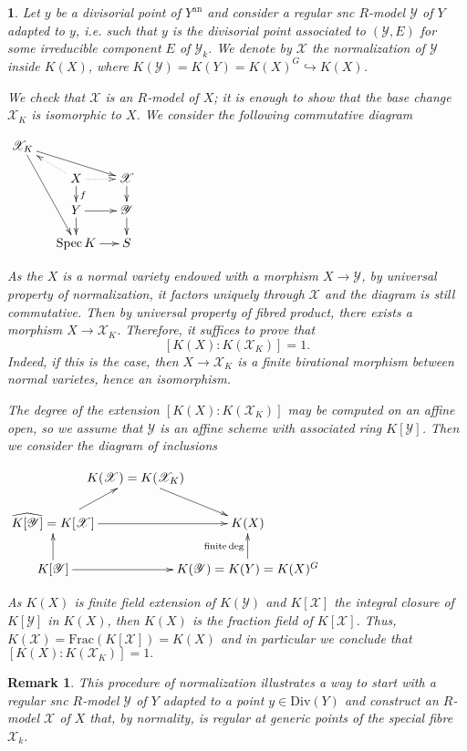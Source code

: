 \documentclass{amsart}%
\numberwithin{equation}{subsection}
\theoremstyle{plain2}
\theoremstyle{definition2}
\newtheorem{rem}[equation]{Remark}
\theoremstyle{stepstyle}
\theoremstyle{point}
\theoremstyle{subpoint}
\newtheorem{subpoint}[equation]{}%
\newcommand{\spa}[1]{\begin{subpoint}#1\end{subpoint}}           %
\newcommand{\cX}{\ensuremath{\mathscr{X}}}
\newcommand{\cY}{\ensuremath{\mathscr{Y}}}
\renewcommand{\cY}{\ensuremath{\mathscr{Y}}}
\newcommand{\Spec}{\ensuremath{\mathrm{Spec}\,}}
\newcommand{\an}{\mathrm{an}}
\begin{document}
\spa{Let $y$ be a divisorial point of $Y^\an$ and consider a regular snc $R$-model $\cY$ of $Y$ adapted to $y$, i.e. such that $y$ is the divisorial point associated to $(\cY, E)$ for some irreducible component $E$ of $\cY_k$. We denote by $\cX$ the normalization of $\cY$ inside $K(X) $, where $K(\cY)=K(Y)=K(X)^{G} \hookrightarrow K(X)$.

We check that $\cX$ is an $R$-model of $X$; it is enough to show that the base change $\cX_K$ is isomorphic to $X$. We consider the following commutative diagram
\begin{center}$
\begin{gathered}
\xymatrixrowsep{1pc}
\xymatrixcolsep{1pc}\xymatrix{ 
\cX_K \ar[drr] \ar[dddr] & & \\
& X \ar@{.>}[r] \ar@{.>}[ul]\ar[d]^{f} & \cX \ar[d] \\
& Y \ar[r] \ar[d] & \cY  \ar[d]\\
& \Spec K \ar[r] & S \\
}
\end{gathered}$
\end{center} As the $X$ is a normal variety endowed with a morphism $X \rightarrow \cY$, by universal property of normalization, it factors uniquely through $\cX$ and the diagram is still commutative. Then by universal property of fibred product, there exists a morphism $X \rightarrow \cX_K$. Therefore, it suffices to prove that $$[K(X):K(\cX_K)]=1.$$ Indeed, if this is the case, then $X \rightarrow \cX_K$ is a finite birational morphism between normal varietes, hence an isomorphism.

The degree of the extension $[K(X):K(\cX_K)]$ may be computed on an affine open, so we assume that $\cY$ is an affine scheme with associated ring $K[\cY]$. Then we consider the diagram of inclusions
\begin{center} 
$ \xymatrixcolsep{-1pc} \xymatrixrowsep{1.5pc}\xymatrix{ 
& K(\cX)=K(\cX_K) \ar[dr] & \\
\widehat{K[\cY]}=K[\cX] \ar[rr] \ar[ru] & & K(X)\\
K[\cY] \ar[u] \ar[rr]& & K(\cY)=K(Y)=K(X)^{G} \ar[u]^{\text{finite} \deg} \\
}$
\end{center} As $K(X)$ is finite field extension of $K(\cY)$ and $K[\cX]$ the integral closure of $K[\cY]$ in $K(X)$, then $K(X)$ is the fraction field of $K[\cX]$. Thus, $K(\cX) = \text{Frac}(K[\cX])=K(X)$ and in particular we conclude that $[K(X):K(\cX_K)]=1.$
}
\begin{rem} \label{rem divisorial repre quotient}
This procedure of normalization illustrates a way to start with a regular snc $R$-model $\cY$ of $Y$ adapted to a point $y \in \text{Div}(Y)$ and construct an $R$-model $\cX$ of $X$ that, by normality, is regular at generic points of the special fibre $\cX_k$. 
\end{rem}
\end{document}
